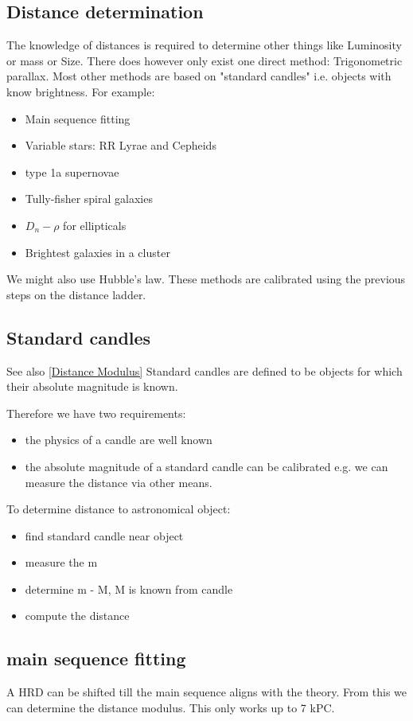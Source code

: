 \documentclass[11pt,a4paper]{article}
\begin{document}
\subsection{Distance determination}
The knowledge of distances is required to determine other things like Luminosity or mass or Size. 
There does however only exist one direct method:  Trigonometric parallax. 
Most other methods are based on "standard candles" i.e. objects with know brightness. 
For example:
\begin{itemize}
    \item Main sequence fitting
    \item Variable stars: RR Lyrae and Cepheids
    \item type 1a supernovae 
    \item Tully-fisher spiral galaxies 
    \item $D_n-\rho$ for ellipticals 
    \item Brightest galaxies in a cluster
\end{itemize}
We might also use Hubble's law.
These methods are calibrated using the previous steps on the distance ladder.

\subsection{Standard candles}
See also \ref{Distance Modulus}
Standard candles are defined to be objects for which their absolute
magnitude is known.

Therefore we have two requirements:
\begin{itemize}
    \item the physics of a candle are well known 
    \item the absolute magnitude of a standard candle can be calibrated e.g. we can measure the distance via other means.
\end{itemize}
To determine distance to astronomical object:
\begin{itemize}
    \item find standard candle near object 
    \item measure the m
    \item determine m - M, M is known from candle 
    \item compute the distance
\end{itemize}
\subsection{main sequence fitting}
A HRD can be shifted till the main sequence aligns with the theory.
From this we can determine the distance modulus.
This only works up to 7 kPC. 
\end{document}
